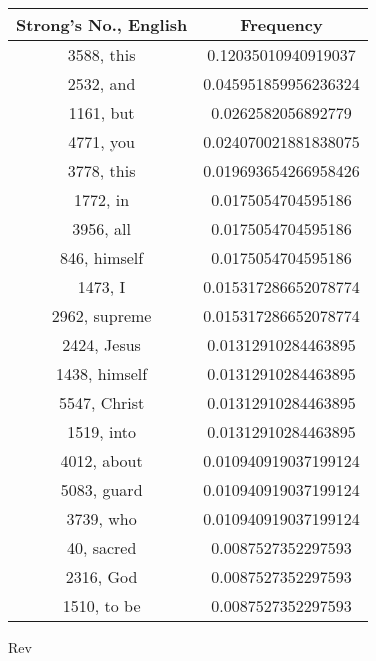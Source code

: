 \documentclass[12pt,letterpaper]{article}
\begin{document}
 \begin{longtable}{|c|c|}
\hline
 Strong's No., English & Frequency \\ \hline  
3588, this & 0.12035010940919037\\ \hline 
 2532, and & 0.045951859956236324\\ \hline 
 1161, but & 0.0262582056892779\\ \hline 
 4771, you & 0.024070021881838075\\ \hline 
 3778, this & 0.019693654266958426\\ \hline 
 1772, in & 0.0175054704595186\\ \hline 
 3956, all & 0.0175054704595186\\ \hline 
 846, himself & 0.0175054704595186\\ \hline 
 1473, I & 0.015317286652078774\\ \hline 
 2962, supreme & 0.015317286652078774\\ \hline 
 2424, Jesus & 0.01312910284463895\\ \hline 
 1438, himself & 0.01312910284463895\\ \hline 
 5547, Christ & 0.01312910284463895\\ \hline 
 1519, into & 0.01312910284463895\\ \hline 
 4012, about & 0.010940919037199124\\ \hline 
 5083, guard & 0.010940919037199124\\ \hline 
 3739, who & 0.010940919037199124\\ \hline 
 40, sacred& 0.0087527352297593\\ \hline 
 2316, God & 0.0087527352297593\\ \hline 
 1510, to be & 0.0087527352297593\\ \hline 
\end{longtable} 
 

Rev
\end{document}
